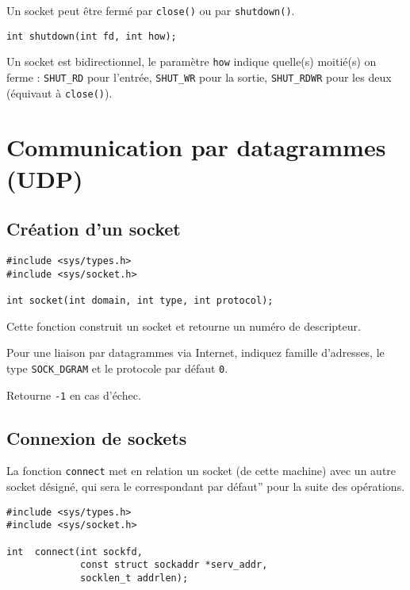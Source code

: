 Un socket peut être fermé par \texttt{close()} ou par \texttt{shutdown()}.


\extrait
\begin{lstlisting}
int shutdown(int fd, int how);
\end{lstlisting}


Un socket est bidirectionnel, le paramètre \texttt{how} indique quelle(s) 
moitié(s) on ferme :
\texttt{SHUT\_RD} pour l'entrée,
\texttt{SHUT\_WR} pour la sortie,
\texttt{SHUT\_RDWR} pour les deux (équivaut à \texttt{close()}).


\section{Communication par datagrammes (UDP)}

\subsection{Création d'un socket}       


\extrait
\begin{lstlisting}
#include <sys/types.h>
#include <sys/socket.h>

int socket(int domain, int type, int protocol);
\end{lstlisting}



Cette fonction construit un socket et retourne un numéro de
descripteur.

Pour une liaison par datagrammes via Internet, indiquez
famille d'adresses, le type \texttt{SOCK\_DGRAM} et le protocole
par défaut \texttt{0}.



Retourne \texttt{-1} en cas d'échec.


\subsection{Connexion de sockets}


La fonction \texttt{connect} met en relation un socket (de cette
machine) avec un autre socket désigné, qui sera le correspondant par
défaut'' pour la suite des opérations.


\extrait
\begin{lstlisting}
#include <sys/types.h>
#include <sys/socket.h>

int  connect(int sockfd, 
             const struct sockaddr *serv_addr,
             socklen_t addrlen);
             \end{lstlisting}



